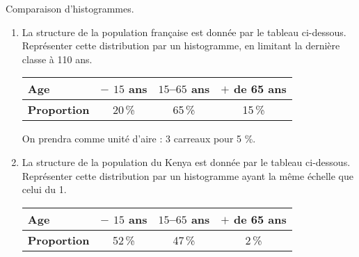 
\begin{exercice}\label{exoSeconde-0040}

Comparaison d'histogrammes.
\begin{enumerate}
\item La structure de la population française est donnée par le tableau ci-dessous. Représenter cette distribution par un histogramme, en limitant la dernière classe à 110 ans.
  
  \begin{center}
    \begin{tabular}{|l|c|c|c|}
      \hline
      \textbf{Age} & $-$ $15$ ans & $15$--$65$ ans & $+$ de 65 ans \\
      \hline
      \textbf{Proportion} & 20\,\% & 65\,\% & 15\,\% \\
      \hline
    \end{tabular}      
  \end{center}
  
  On prendra comme unité d'aire : 3 carreaux pour 5 \%.

\item La structure de la population du Kenya est donnée par le tableau
  ci-dessous. Représenter cette distribution par un histogramme ayant
  la même échelle que celui du 1.

  \begin{center}
    \begin{tabular}{|l|c|c|c|}
      \hline
      \textbf{Age} & $-$ $15$ ans & $15$--$65$ ans & $+$ de 65 ans \\
      \hline
      \textbf{Proportion} & 52\,\% & 47\,\% & 2\,\% \\
      \hline
    \end{tabular}      
  \end{center}
  
\end{enumerate}

\end{exercice}
